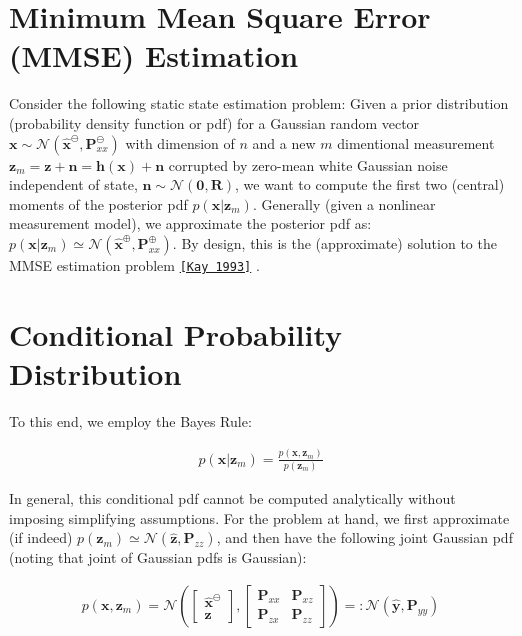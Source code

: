 \hypertarget{update_basics}{}\section{Minimum Mean Square Error (\+M\+M\+S\+E) Estimation}\label{update_basics}
Consider the following static state estimation problem\+: Given a prior distribution (probability density function or pdf) for a Gaussian random vector $ \mathbf x\sim \mathcal N (\hat{\mathbf x}^\ominus, \mathbf P_{xx}^\ominus)$ with dimension of $n$ and a new $m$ dimentional measurement $\mathbf{z}_m = \mathbf z + \mathbf n = \mathbf h(\mathbf x) + \mathbf n $ corrupted by zero-\/mean white Gaussian noise independent of state, $ \mathbf n \sim \mathcal N(\mathbf 0, \mathbf R)$, we want to compute the first two (central) moments of the posterior pdf $ p(\mathbf x|\mathbf z_m)$. Generally (given a nonlinear measurement model), we approximate the posterior pdf as\+: $ p(\mathbf x|\mathbf z_m) \simeq \mathcal N (\hat{\mathbf x}^\oplus, \mathbf P_{xx}^\oplus)$. By design, this is the (approximate) solution to the M\+M\+SE estimation problem \href{http://users.isr.ist.utl.pt/~pjcro/temp/Fundamentals%20Of%20Statistical%20Signal%20Processing--Estimation%20Theory-Kay.pdf}{\tt \mbox{[}Kay 1993\mbox{]}} \cite{Kay1993}.\hypertarget{update_conditional-pdf}{}\section{Conditional Probability Distribution}\label{update_conditional-pdf}
To this end, we employ the Bayes Rule\+:

\begin{align*} p(\mathbf{x} | \mathbf{z}_m) = \frac{p(\mathbf{x},\mathbf{z}_m)}{p(\mathbf{z}_m)} \end{align*}

In general, this conditional pdf cannot be computed analytically without imposing simplifying assumptions. For the problem at hand, we first approximate (if indeed) $ p(\mathbf{z}_m) \simeq \mathcal N (\hat{\mathbf z}, \mathbf P_{zz}) $, and then have the following joint Gaussian pdf (noting that joint of Gaussian pdfs is Gaussian)\+:

\begin{align*} p(\mathbf{x},\mathbf{z}_m) = \mathcal N \left( \begin{bmatrix} \hat{\mathbf x}^\ominus \\ \mathbf z \end{bmatrix}, \begin{bmatrix}\mathbf P_{xx} & \mathbf P_{xz} \\ \mathbf P_{zx} & \mathbf P_{zz} \end{bmatrix} \right) =: \mathcal N(\hat{\mathbf y}, \mathbf P_{yy}) \end{align*}

